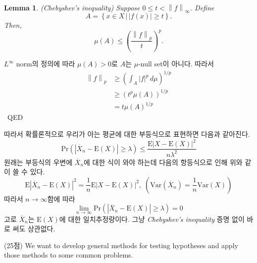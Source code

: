 \documentclass[answers]{exam}
\newtheorem{lemma}{Lemma}
\newenvironment{proof}{{\sc Proof:}}{~\hfill QED}
\begin{document}
\begin{questions}
\begin{solution}
\begin{enumerate}[(a)]
        \begin{lemma}
          (Chebyshev's inequality) Suppose $0\leq t < \left\|f\right\|_{\infty}$. Define
          $$
            A=\left\{x\in X\,|\,\left|f\left(x\right)\right|\geq t \right\}.
          $$
          Then,
          $$
            \mu\left(A\right)\leq \left(\dfrac{\left\|f\right\|_{p}}{t}\right)^{p}.
          $$
        \end{lemma}
        \begin{proof}
          $L^{\infty}$ norm의 정의에 따라 $\mu\left(A\right)>0$로 $A$는 $\mu$-null set이 아니다. 따라서
          \begin{align}
            \left\|f\right\|_{p}&\geq \left(\int_{A}\left|f\right|^{p}\,d\mu\right)^{1/p}\\
            &\geq \left(t^{p}\mu\left(A\right)\right)^{1/p}\\
            &= t\mu\left(A\right)^{1/p}
          \end{align}
        \end{proof}\par
        따라서 확률론적으로 우리가 아는 평균에 대한 부등식으로 표현하면 다음과 같아진다.
        \begin{equation}
          \mathrm{Pr}\left(\left|\overline{X}_{n}-\mathrm{E}\left(X\right)\right|\geq \lambda\right)\leq \dfrac{\mathrm{E}\left|X-\mathrm{E}\left(X\right)\right|^{2}}{n\lambda^{2}}
        \end{equation}
        원래는 부등식의 우변에 $\overline{X}_{n}$에 대한 식이 와야 하는데 다음의 항등식으로 인해 위와 같이 쓸 수 있다.
        $$
          \mathrm{E}\left|\overline{X}_{n}-\mathrm{E}\left(X\right)\right|^{2}= \dfrac{1}{n}\mathrm{E}\left|X-\mathrm{E}\left(X\right)\right|^{2},\;\left(\mathrm{Var}\left(\overline{X}_{n}\right)=\dfrac{1}{n}\mathrm{Var}\left(X\right)\right)
        $$
        따라서 $n\to\infty$함에 따라
        \begin{equation}
          \lim_{n\to\infty}\mathrm{Pr}\left(\left|\overline{X}_{n}-\mathrm{E}\left(X\right)\right|\geq \lambda\right)=0
        \end{equation}
        고로 $\overline{X}_{n}$는 $\mathrm{E}\left(X\right)$에 대한 일치추정량이다. 그냥 \emph{Chebyshev's inequality} 증명 없이 바로 써도 상관없다.
      \end{enumerate}
    \end{solution}
    \question
    (25점) We want to develop general methods for testing hypotheses and apply those methods to some common problems.
    \begin{enumerate}[(a)]

\end{enumerate}
\end{questions}
\end{document}

